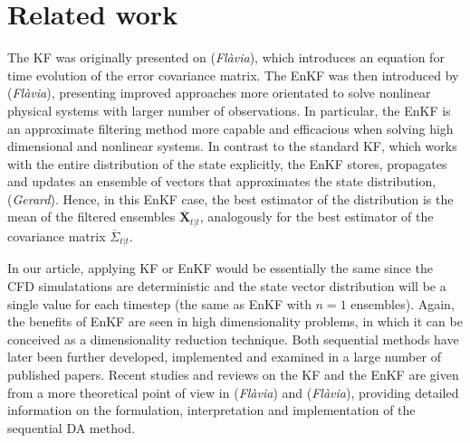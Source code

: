 \documentclass{article}
\theoremstyle{definition}
\theoremstyle{definition}
\theoremstyle{remark}
\theoremstyle{mythmstyle}
\newcommand{\Xt}{\textbf{X}_{t|t}}
\newcommand{\X}{\hat{\textbf{X}}_{t}}
\begin{document}

\section{Related work}

The KF was originally presented on \cite{kalman1960new} (\textit{Flàvia}), which introduces an equation for time evolution of the error covariance matrix. The EnKF was then introduced by \cite{evensen1994sequential} (\textit{Flàvia}), presenting improved approaches more orientated to solve nonlinear physical systems with larger number of observations. In particular, the EnKF is an approximate filtering method more capable and efficacious when solving high dimensional and nonlinear systems. In contrast to the standard KF, which works with the entire distribution of the state explicitly, the EnKF stores, propagates and updates an ensemble of vectors that approximates the state distribution, \cite{katzfuss2016understanding} (\textit{Gerard}). Hence, in this EnKF case, the best estimator of the distribution is the mean of the filtered ensembles $\overline{\bm{X}}_{t|t}$, analogously for the best estimator of the covariance matrix $\overline{\Sigma}_{t|t}$. 

In our article, applying KF or EnKF would be essentially the same since the CFD simulatations are deterministic and the state vector distribution will be a single value for each timestep (the same as EnKF with $n=1$ ensembles). Again, the benefits of EnKF are seen in high dimensionality problems, in which it can be conceived as a dimensionality reduction technique. Both sequential methods have later been further developed, implemented and examined in a large number of published papers. Recent studies and reviews on the KF and the EnKF are given from a more theoretical point of view in \cite{evensen2009data} (\textit{Flàvia}) and \cite{brockwell2002introduction} (\textit{Flàvia}), providing detailed information on the formulation, interpretation and implementation of the sequential DA method.
\end{document}
